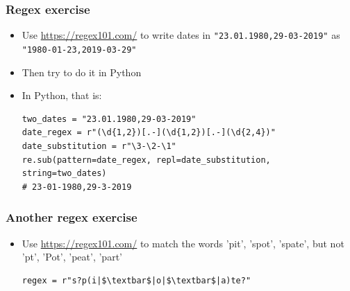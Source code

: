\documentclass[xcolor=table]{beamer}
\begin{document}

\begin{frame}[fragile]
    \frametitle{Regex exercise}
    \begin{itemize}
        \item Use \url{https://regex101.com/} to write dates in \texttt{"23.01.1980,29-03-2019"} as \texttt{"1980-01-23,2019-03-29"} \pause
        \item Then try to do it in Python \pause 
        \item In Python, that is:
\begin{lstlisting}[style=python,belowskip=-1.5 \baselineskip]
two_dates = "23.01.1980,29-03-2019" 
date_regex = r"(\d{1,2})[.-](\d{1,2})[.-](\d{2,4})"
date_substitution = r"\3-\2-\1"
re.sub(pattern=date_regex, repl=date_substitution, string=two_dates)
# 23-01-1980,29-3-2019 
\end{lstlisting} 
    \end{itemize}
\end{frame}

\begin{frame}[fragile]
    \frametitle{Another regex exercise}
    \begin{itemize}
        \item Use \url{https://regex101.com/} to match the words 'pit', 'spot', 'spate', but not 'pt', 'Pot', 'peat', 'part' \pause
\begin{lstlisting}[style=python,belowskip=-1.5 \baselineskip]
    regex = r"s?p(i|$\textbar$|o|$\textbar$|a)te?"
\end{lstlisting} 
    \end{itemize}
\end{frame}

\end{document}

